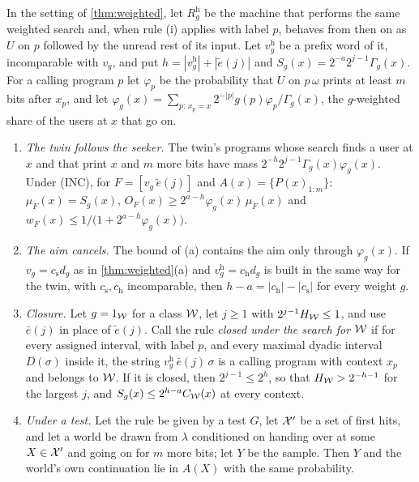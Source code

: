 \begin{proposition}\label{prop:twin-stakes}
In the setting of \cref{thm:weighted}, let $R^{\mathrm h}_g$ be the machine that performs the same weighted
search and, when rule (i) applies with label $p$, behaves from then on as $U$ on $p$ followed by the unread
rest of its input. Let $v^{\mathrm h}_g$ be a prefix word of it, incomparable with $v_g$, and put
$h=|v^{\mathrm h}_g|+|\tilde e(j)|$ and $S_g(x)=2^{-a}2^{j-1}\Gamma_g(x)$. For a calling program $p$ let
$\varphi_p$ be the probability that $U$ on $p\,\omega$ prints at least $m$ bits after $x_p$, and let
$\varphi_g(x)=\sum_{p:\,x_p=x}2^{-|p|}g(p)\varphi_p\big/\Gamma_g(x)$, the $g$-weighted share of the users at
$x$ that go on.
\begin{enumerate}[label=(\alph*),leftmargin=2em,itemsep=1pt,topsep=2pt]
\item \emph{The twin follows the seeker.} The twin's programs whose search finds a user at $x$ and that
print $x$ and $m$ more bits have mass $2^{-h}2^{j-1}\Gamma_g(x)\varphi_g(x)$. Under (INC), for
$F=[v_g\,\tilde e(j)]$ and $A(x)=\{P(x)_{1:m}\}$: $\mu_F(x)=S_g(x)$,
$O_F(x)\ge2^{a-h}\varphi_g(x)\,\mu_F(x)$ and $w_F(x)\le1/\bigl(1+2^{a-h}\varphi_g(x)\bigr)$.
\item \emph{The aim cancels.} The bound of (a) contains the aim only through $\varphi_g(x)$. If
$v_g=c_{\mathrm s}d_g$ as in \cref{thm:weighted}(a) and $v^{\mathrm h}_g=c_{\mathrm h}d_g$ is built in the
same way for the twin, with $c_{\mathrm s},c_{\mathrm h}$ incomparable, then $h-a=|c_{\mathrm
h}|-|c_{\mathrm s}|$ for every weight $g$.
\item \emph{Closure.} Let $g=1_{\mathcal W}$ for a class $\mathcal W$, let $j\ge1$ with $2^{j-1}H_{\mathcal W}\le1$, and use
$\bar e(j)$ in place of $\tilde e(j)$. Call the rule \emph{closed under the search for $\mathcal W$} if for every
assigned interval, with label $p$, and every maximal dyadic interval $D(\sigma)$ inside it, the string
$v^{\mathrm h}_g\,\bar e(j)\,\sigma$ is a calling program with context $x_p$ and belongs to $\mathcal W$. If it is
closed, then $2^{j-1}\le2^h$, so that $H_{\mathcal W}>2^{-h-1}$ for the largest $j$, and
$S_g(x)\le2^{h-a}C_{\mathcal W}(x)$ at every context.
\item \emph{Under a test.} Let the rule be given by a test $G$, let $\mathcal X'$ be a set of first hits, and let a
world be drawn from $\lambda$ conditioned on handing over at some $X\in\mathcal X'$ and going on for $m$ more bits;
let $Y$ be the sample. Then $Y$ and the world's own continuation lie in $A(X)$ with the same probability.
\end{enumerate}\end{proposition}
